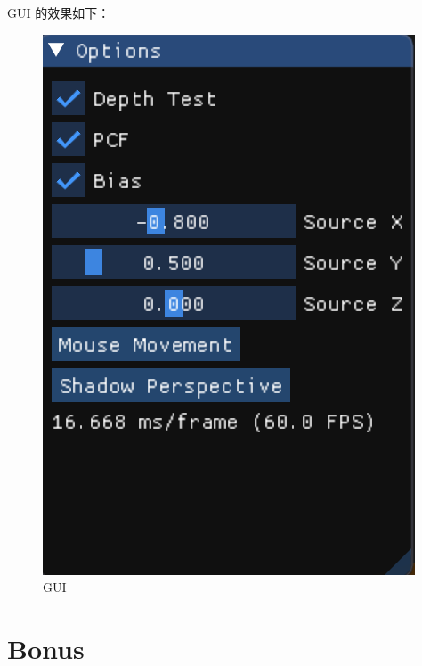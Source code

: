 \documentclass[12pt]{article}
\begin{document}
\begin{enumerate}
    GUI 的效果如下：
    \begin{figure}[H]
        \centering
        \includegraphics[scale=0.8]{gui.png}
        \caption{GUI}
        \label{}
    \end{figure}
\end{enumerate}

\section{Bonus}
\end{document}

